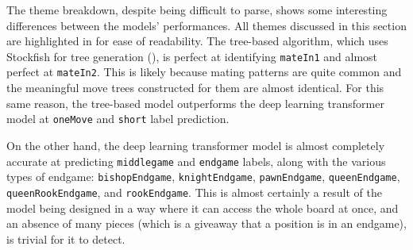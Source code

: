 The theme breakdown, despite being difficult to parse, shows some interesting
differences between the models' performances. All themes discussed in this
section are highlighted in  for ease of readability. The
tree-based algorithm, which uses Stockfish for tree generation
(), is perfect at identifying \texttt{mateIn1} and almost perfect
at \texttt{mateIn2}. This is likely because mating patterns are quite common
and the meaningful move trees constructed for them are almost identical. For
this same reason, the tree-based model outperforms the deep learning
transformer model at \texttt{oneMove} and \texttt{short} label prediction.

On the other hand, the deep learning transformer model is almost completely
accurate at predicting \texttt{middlegame} and \texttt{endgame} labels, along
with the various types of endgame: \texttt{bishopEndgame},
\texttt{knightEndgame}, \texttt{pawnEndgame}, \texttt{queenEndgame},
\texttt{queenRookEndgame}, and \texttt{rookEndgame}. This is almost certainly a
result of the model being designed in a way where it can access the whole board
at once, and an absence of many pieces (which is a giveaway that a position is
in an endgame), is trivial for it to detect. 


